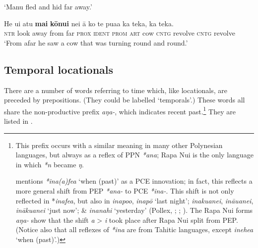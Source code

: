 \glt 
‘Manu fled and hid far away.’ \textstyleExampleref{[R459.007]} 
\z

\ea\label{ex:3.172}
\gll He u{\ꞌ}i atu \textbf{mai} \textbf{kōnui} nei {\ꞌ}ā ko te pua{\ꞌ}a ka teka, ka teka. \\
\textsc{ntr} look away from far \textsc{prox} \textsc{ident} \textsc{prom} \textsc{art} cow \textsc{cntg} revolve \textsc{cntg} revolve \\

\glt 
‘From afar he saw a cow that was turning round and round.’ \textstyleExampleref{[R250.137]} 
\zlast


  
\subsection{Temporal locationals}\label{sec:3.6.4}
There are a number of words referring to time which, like locationals, are preceded by prepositions. (They could be labelled ‘temporals’.) These words all share the non-productive prefix \textit{{\ꞌ}aŋa-}, which indicates recent past.\footnote{\label{fn:155}This prefix occurs with a similar meaning in many other Polynesian languages, but always as a reflex of PPN \textit{*{\ꞌ}ana}; Rapa Nui is the only language in which \textit{*n} became \textit{ŋ}. 

\citet[12]{Green1985} mentions \textit{*ina(a)fea} ‘when (past)’ as a PCE innovation; in fact, this reflects a more general shift from PEP \textit{*{\ꞌ}ana-} to PCE \textit{*ina-}. This shift is not only reflected in *\textit{inafea}, but also in  \textit{inapoo},  \textit{inapō} ‘last night’;  \textit{inakuanei},  \textit{inā{\ꞌ}uanei},  \textit{inākuanei} ‘just now’;  \&  \textit{inanahi} ‘yesterday’ (Pollex, \citealt{GreenhillClark2011}; \citealt{Bauer1993}; \citealt{AcadémieTahitienne1999}). The Rapa Nui forms \textit{{\ꞌ}aŋa-} show that the shift \textit{a} {\textgreater} \textit{i} took place after Rapa Nui split from PEP. (Notice also that all reflexes of \textit{*ina} are from Tahitic languages, except  \textit{inehea} ‘when (past)’.)} They are listed in .

